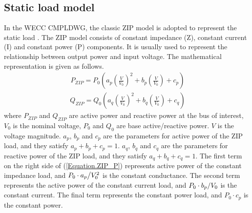 \documentclass[journal]{IEEEtran}
\begin{document}
	\subsection{Static load model}
	In the WECC CMPLDWG, the classic ZIP model is adopted to represent the static load \cite{Wang2019}. The ZIP model consists of constant impedance (Z), constant current (I) and constant power (P) components. It is usually used to represent the relationship between output power and input voltage. The mathematical representation is given as follows.
	\begin{eqnarray}
	\label{Equation.ZIP_P}
	\ {P_{ZIP}} = {P_{0}}\left( {{a_p}{{\left( {\frac{{{V}}}{{{V_0}}}} \right)}^2} + {b_p}\left( {\frac{{{V}}}{{{V_0}}}} \right) + {c_p}} \right)
	\end{eqnarray}
	\begin{eqnarray}
	\label{Equation.ZIP_Q}
	\ {Q_{ZIP}} = {Q_{0}}\left( {{a_q}{{\left( {\frac{{{V}}}{{{V_0}}}} \right)}^2} + {b_q}\left( {\frac{{{V}}}{{{V_0}}}} \right) + {c_q}} \right)
	\end{eqnarray}
	where $P_{ZIP}$ and $Q_{ZIP}$ are active power and reactive power at the bus of interest, $V_0$ is the nominal voltage, $P_{0}$ and $Q_{0}$ are base active/reactive power. $V$ is the voltage magnitude. $a_{p}$, $b_{p}$ and $c_{p}$ are the parameters for active power of the ZIP load, and they satisfy $a_{p}+b_{p}+c_{p}=1$. $a_{q}$, $b_{q}$ and $c_{q}$ are the parameters for reactive power of the ZIP load, and they satisfy $a_{q}+b_{q}+c_{q}=1$. {The first term on the right side of (\ref{Equation.ZIP_P}) represents active power of the constant impedance load, and ${{{P_{0}} \cdot {a_p}} \mathord{\left/ {\vphantom {{{P_{0}} \cdot {a_p}} {V_0^2}}} \right. \kern-\nulldelimiterspace} {V_0^2}}$ is the constant conductance. The second term represents the active power of the constant current load, and ${{{P_{0}} \cdot {b_p}} \mathord{\left/ {\vphantom {{{P_{0}} \cdot {b_p}} {{V_0}}}} \right. \kern-\nulldelimiterspace} {{V_0}}}$ is the constant current. The final term represents the constant power load, and ${P_{0}} \cdot {c_p}$ is the constant power.} 
\end{document}
